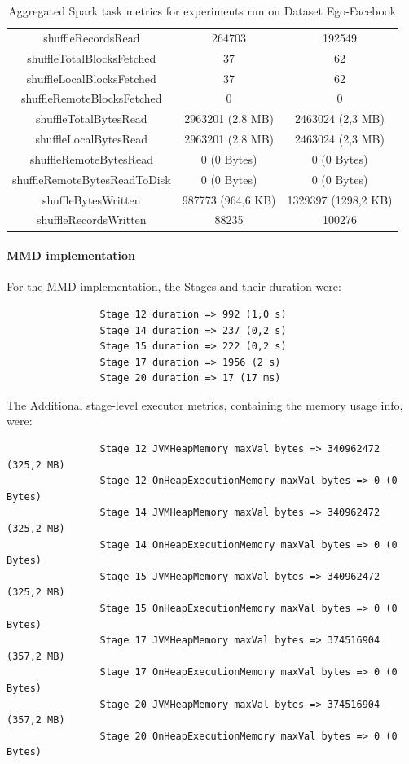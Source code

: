 \documentclass[a4paper,11pt, twoside]{article}
\begin{document}
\begin{table}[h!]
\begin{tabular}{ccc}
                        shuffleRecordsRead & 264703 & 192549 \\
                        shuffleTotalBlocksFetched & 37 & 62 \\
                        shuffleLocalBlocksFetched & 37 & 62 \\
                        shuffleRemoteBlocksFetched & 0 & 0 \\
                        shuffleTotalBytesRead & 2963201 (2,8 MB) & 2463024 (2,3 MB) \\
                        shuffleLocalBytesRead & 2963201 (2,8 MB) & 2463024 (2,3 MB) \\
                        shuffleRemoteBytesRead & 0 (0 Bytes) & 0 (0 Bytes) \\
                        shuffleRemoteBytesReadToDisk & 0 (0 Bytes) & 0 (0 Bytes) \\
                        shuffleBytesWritten & 987773 (964,6 KB) & 1329397 (1298,2 KB) \\
                        shuffleRecordsWritten & 88235 & 100276 \\
            		\bottomrule
            	\end{tabular}
                    \caption{Aggregated Spark task metrics for experiments run on Dataset Ego-Facebook}
                    \label{tab:taskmetrics2}
            \end{table} 
    
            \paragraph{MMD implementation}
            For the MMD implementation, the Stages and their duration were:
            \begin{verbatim}
                Stage 12 duration => 992 (1,0 s)
                Stage 14 duration => 237 (0,2 s)
                Stage 15 duration => 222 (0,2 s)
                Stage 17 duration => 1956 (2 s)
                Stage 20 duration => 17 (17 ms)
            \end{verbatim}
            \bigskip
            The Additional stage-level executor metrics, containing the memory usage info, were:
            \begin{verbatim}
                Stage 12 JVMHeapMemory maxVal bytes => 340962472 (325,2 MB)
                Stage 12 OnHeapExecutionMemory maxVal bytes => 0 (0 Bytes)
                Stage 14 JVMHeapMemory maxVal bytes => 340962472 (325,2 MB)
                Stage 14 OnHeapExecutionMemory maxVal bytes => 0 (0 Bytes)
                Stage 15 JVMHeapMemory maxVal bytes => 340962472 (325,2 MB)
                Stage 15 OnHeapExecutionMemory maxVal bytes => 0 (0 Bytes)
                Stage 17 JVMHeapMemory maxVal bytes => 374516904 (357,2 MB)
                Stage 17 OnHeapExecutionMemory maxVal bytes => 0 (0 Bytes)
                Stage 20 JVMHeapMemory maxVal bytes => 374516904 (357,2 MB)
                Stage 20 OnHeapExecutionMemory maxVal bytes => 0 (0 Bytes)
            \end{verbatim}
    
\end{document}
